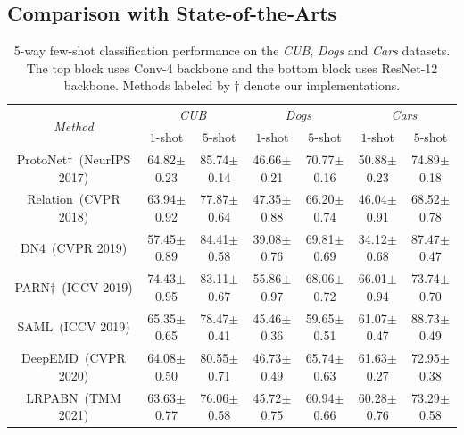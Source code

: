 \documentclass[letterpaper]{article} %
\begin{document}
\subsection{Comparison with State-of-the-Arts}
\begin{table}[!ht]
\setlength\tabcolsep{4.8pt}
\centering
\caption{5-way few-shot classification performance on the \textit{CUB}, \textit{Dogs} and \textit{Cars} datasets. {The top block uses Conv-4 backbone and the bottom block uses ResNet-12 backbone.} Methods labeled by $\dag$ denote our implementations.}
\label{tab:1}
\begin{tabular}{ccccccc}
\toprule[1pt]
\multirow{2}{*}{\it{Method}}
& \multicolumn{2}{c}{\it{CUB}}
& \multicolumn{2}{c}{\it{Dogs}}
& \multicolumn{2}{c}{\it{Cars}}  \\

&\multicolumn{1}{c}{$1$-shot}
& \multicolumn{1}{c}{$5$-shot}
& \multicolumn{1}{c}{$1$-shot}
& \multicolumn{1}{c}{$5$-shot}
& \multicolumn{1}{c}{$1$-shot}
& \multicolumn{1}{c}{$5$-shot} \\ \midrule


ProtoNet$\dag$~(NeurIPS 2017)%
& 64.82$\pm$0.23
& 85.74$\pm$0.14
& 46.66$\pm$0.21
& 70.77$\pm$0.16
& 50.88$\pm$0.23
& 74.89$\pm$0.18 \\

Relation~(CVPR 2018)%
& 63.94$\pm$0.92
& 77.87$\pm$0.64
& 47.35$\pm$0.88
& 66.20$\pm$0.74
& 46.04$\pm$0.91
& 68.52$\pm$0.78 \\

DN4~(CVPR 2019)%
& 57.45$\pm$0.89
& 84.41$\pm$0.58
& 39.08$\pm$0.76
& 69.81$\pm$0.69
& 34.12$\pm$0.68
& {87.47$\pm$0.47} \\



PARN$\dag$~(ICCV 2019)%
& {74.43$\pm$0.95}
& 83.11$\pm$0.67
& 55.86$\pm$0.97
& 68.06$\pm$0.72
& 66.01$\pm$0.94
& 73.74$\pm$0.70 \\


SAML~(ICCV 2019)%
& {65.35$\pm$0.65}
& 78.47$\pm$0.41
& 45.46$\pm$0.36
& 59.65$\pm$0.51
& 61.07$\pm$0.47
& 88.73$\pm$0.49 \\

DeepEMD~(CVPR 2020)%
& 64.08$\pm$0.50
& 80.55$\pm$0.71
& 46.73$\pm$0.49
& 65.74$\pm$0.63
& 61.63$\pm$0.27
& 72.95$\pm$0.38 \\


LRPABN~(TMM 2021)%
& 63.63$\pm$0.77
& 76.06$\pm$0.58
& 45.72$\pm$0.75
& 60.94$\pm$0.66
& 60.28$\pm$0.76
& 73.29$\pm$0.58 \\



\end{tabular}
\end{table}
\end{document}
